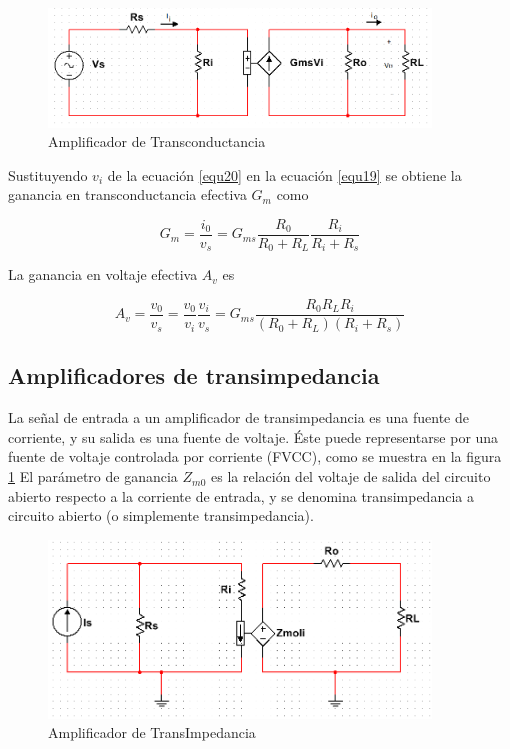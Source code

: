 \documentclass[12pt]{book}
\theoremstyle{definition}
\theoremstyle{remark}
\theoremstyle{plain}
\begin{document}
\begin{figure}
\centering
\includegraphics[width=4in]{amplificadortransconductancia.png}
\caption{Amplificador de Transconductancia}
\label{fig7}
\end{figure}

Sustituyendo $v_i$ de la ecuación \ref{equ20} en la ecuación \ref{equ19} se obtiene la ganancia en transconductancia efectiva $G_m$ como

\begin{equation}
\label{equ21}
G_m = \frac{i_0}{v_s}= G_{m s} \frac{R_0}{R_0+R_L} \frac{R_i}{R_i+R_s}
\end{equation}

La ganancia en voltaje efectiva $A_v$ es

\begin{equation}
\label{equ22}
A_v = \frac{v_0}{v_s}=\frac{v_0}{v_i} \frac{v_i}{v_s}= G_{m s} \frac{R_0 R_L R_i}{(R_0+R_L)(R_i+R_s)}
\end{equation}

\subsection{Amplificadores de transimpedancia}
La señal de entrada a un amplificador de transimpedancia es una fuente de corriente, y su salida es una fuente de voltaje. Éste puede representarse por una fuente de voltaje controlada por corriente (FVCC), como se muestra en la figura \ref{fig7} El parámetro de ganancia $Z_{m 0}$ es la relación del voltaje de salida del circuito abierto respecto a la corriente de entrada, y se denomina transimpedancia a circuito abierto (o simplemente transimpedancia).


\begin{figure}
\centering
\includegraphics[width=4in]{AmplificadoresTransImpedancia.png}
\caption{Amplificador de TransImpedancia}
\label{fig8}
\end{figure}
\end{document}

